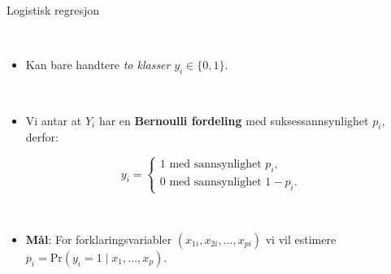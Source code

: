 \documentclass[10pt,ignorenonframetext,]{beamer}
\providecommand{\tightlist}{%
  \setlength{\itemsep}{0pt}\setlength{\parskip}{0pt}}
\begin{document}
\begin{frame}{Logistisk regresjon}
\protect\hypertarget{logistisk-regresjon}{}

\(~\)

\begin{itemize}
\tightlist
\item
  Kan bare handtere \emph{to klasser} \(y_i \in \{0,1\}\).
\end{itemize}

\(~\)

\begin{itemize}
\tightlist
\item
  Vi antar at \(Y_i\) har en \textbf{Bernoulli fordeling} med
  suksessannsynlighet \(p_i\), derfor:
\end{itemize}

\[y_i = \begin{cases} 1 \text{ med sannsynlighet } p_i, \\ 0 \text{ med sannsynlighet } 1-p_i. \end{cases}\]

\(~\)

\begin{itemize}
\tightlist
\item
  \textbf{Mål}: For forklaringsvariabler
  \((x_{1i},x_{2i},\ldots,x_{pi})\) vi vil estimere
  \(p_i = \text{Pr}(y_i=1 \mid x_1,\ldots,x_p)\).
\end{itemize}

\end{frame}
\end{document}
